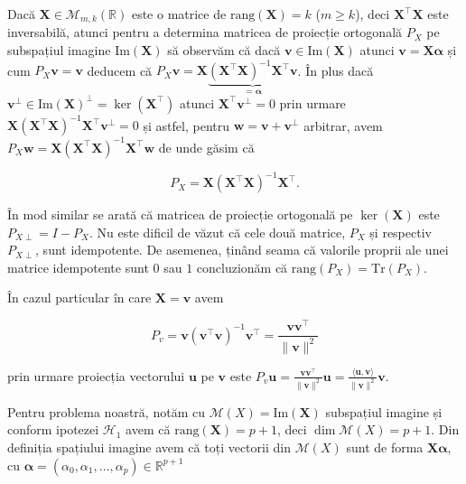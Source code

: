 \documentclass[]{article}
\begin{document}
Dacă \(\boldsymbol{X}\in\mathcal{M}_{m,k}(\mathbb{R})\) este o matrice
de \(\mathrm{rang}(\boldsymbol{X}) = k\) (\(m\geq k\)), deci
\(\boldsymbol{X}^\intercal\boldsymbol{X}\) este inversabilă, atunci
pentru a determina matricea de proiecție ortogonală \(P_X\) pe
subspațiul imagine \(\mathrm{Im}(\boldsymbol{X})\) să observăm că dacă
\(\boldsymbol v\in \textrm{Im}(\boldsymbol X)\) atunci
\(\boldsymbol v = \boldsymbol X \boldsymbol \alpha\) și cum
\(P_X \boldsymbol v = \boldsymbol v\) deducem că
\(P_X \boldsymbol v = \boldsymbol{X}\underbrace{\left(\boldsymbol{X}^\intercal\boldsymbol{X}\right)^{-1}\boldsymbol{X}^\intercal \boldsymbol v}_{= \boldsymbol \alpha}\).
În plus dacă
\(\boldsymbol v^\perp\in \textrm{Im}(\boldsymbol X)^\perp = \ker(\boldsymbol X^\intercal)\)
atunci \(\boldsymbol X^\intercal\boldsymbol v^\perp = 0\) prin urmare
\(\boldsymbol{X}\left(\boldsymbol{X}^\intercal\boldsymbol{X}\right)^{-1}\boldsymbol{X}^\intercal \boldsymbol v^\perp = 0\)
și astfel, pentru
\(\boldsymbol w = \boldsymbol v + \boldsymbol v^\perp\) arbitrar, avem
\(P_{X}\boldsymbol w = \boldsymbol{X}\left(\boldsymbol{X}^\intercal\boldsymbol{X}\right)^{-1}\boldsymbol{X}^\intercal\boldsymbol w\)
de unde găsim că

\[
  P_{X} = \boldsymbol{X}\left(\boldsymbol{X}^\intercal\boldsymbol{X}\right)^{-1}\boldsymbol{X}^\intercal.
\]

În mod similar se arată că matricea de proiecție ortogonală pe
\(\ker(\boldsymbol{X})\) este \(P_{X\perp} = I - P_{X}\). Nu este
dificil de văzut că cele două matrice, \(P_{X}\) și respectiv
\(P_{X\perp}\), sunt idempotente. De asemenea, ținând seama că valorile
proprii ale unei matrice idempotente sunt \(0\) sau \(1\) concluzionăm
că \(\mathrm{rang}(P_X) = \mathrm{Tr}(P_X)\).

În cazul particular în care \(\boldsymbol{X} = \boldsymbol{v}\) avem

\[
  P_v = \boldsymbol{v}\left(\boldsymbol{v}^\intercal\boldsymbol{v}\right)^{-1}\boldsymbol{v}^\intercal = \frac{\boldsymbol{v}\boldsymbol{v}^\intercal}{\lVert\boldsymbol{v}\rVert^2}
\]

prin urmare proiecția vectorului \(\boldsymbol{u}\) pe
\(\boldsymbol{v}\) este
\(P_v\boldsymbol{u} = \frac{\boldsymbol{v}\boldsymbol{v}^\intercal}{\lVert\boldsymbol{v}\rVert^2}\boldsymbol{u} = \frac{\langle\boldsymbol{u}, \boldsymbol{v}\rangle}{\lVert\boldsymbol{v}\rVert^2}\boldsymbol{v}\).

Pentru problema noastră, notăm cu
\(\mathcal{M}(X) = \mathrm{Im}(\boldsymbol{X})\) subspațiul imagine și
conform ipotezei \(\mathcal{H}_1\) avem că
\(\mathrm{rang}(\boldsymbol{X}) = p+1\), deci
\(\dim \mathcal{M}(X) = p+1\). Din definiția spațiului imagine avem că
toți vectorii din \(\mathcal{M}(X)\) sunt de forma
\(\boldsymbol X \boldsymbol\alpha\), cu
\(\boldsymbol \alpha = (\alpha_0, \alpha_1,\ldots, \alpha_p)\in\mathbb{R}^{p+1}\)
\end{document}
